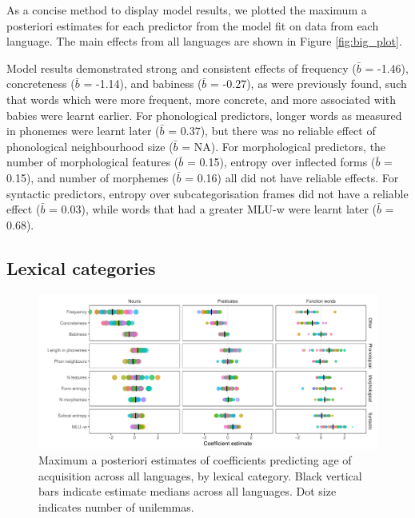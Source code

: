 \documentclass[10pt, letterpaper]{article}
\newenvironment{CodeChunk}{}{}
\begin{document}
As a concise method to display model results, we plotted the maximum a
posteriori estimates for each predictor from the model fit on data from
each language. The main effects from all languages are shown in Figure
\ref{fig:big_plot}.

Model results demonstrated strong and consistent effects of frequency
(\(\bar{b}\) = -1.46), concreteness (\(\bar{b}\) = -1.14), and babiness
(\(\bar{b}\) = -0.27), as were previously found, such that words which
were more frequent, more concrete, and more associated with babies were
learnt earlier. For phonological predictors, longer words as measured in
phonemes were learnt later (\(\bar{b}\) = 0.37), but there was no
reliable effect of phonological neighbourhood size (\(\bar{b}\) = NA).
For morphological predictors, the number of morphological features
(\(\bar{b}\) = 0.15), entropy over inflected forms (\(\bar{b}\) = 0.15),
and number of morphemes (\(\bar{b}\) = 0.16) all did not have reliable
effects. For syntactic predictors, entropy over subcategorisation frames
did not have a reliable effect (\(\bar{b}\) = 0.03), while words that
had a greater MLU-w were learnt later (\(\bar{b}\) = 0.68).

\hypertarget{lexical-categories}{%
\subsection{Lexical categories}\label{lexical-categories}}

\begin{CodeChunk}
\begin{figure}[ht]

{\centering \includegraphics[width=500px]{figs/lc_plot-1}

}

\caption[Maximum a posteriori estimates of coefficients predicting age of acquisition across all languages, by lexical category]{Maximum a posteriori estimates of coefficients predicting age of acquisition across all languages, by lexical category. Black vertical bars indicate estimate medians across all languages. Dot size indicates number of unilemmas.}\label{fig:lc_plot}
\end{figure}
\end{CodeChunk}
\end{document}
